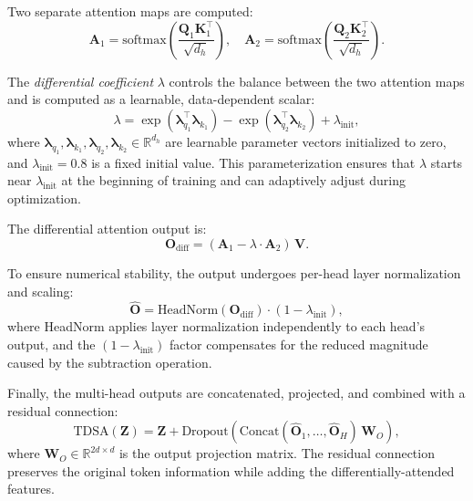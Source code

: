 Two separate attention maps are computed:
\begin{equation}\label{eq:dual_attn}
    \mathbf{A}_1 = \text{softmax}\!\left(\frac{\mathbf{Q}_1 \mathbf{K}_1^\top}{\sqrt{d_h}}\right), \quad
    \mathbf{A}_2 = \text{softmax}\!\left(\frac{\mathbf{Q}_2 \mathbf{K}_2^\top}{\sqrt{d_h}}\right).
\end{equation}

The \emph{differential coefficient} $\lambda$ controls the balance between the two attention maps and is computed as a learnable, data-dependent scalar:
\begin{equation}\label{eq:lambda}
    \lambda = \exp(\boldsymbol{\lambda}_{q_1}^\top \boldsymbol{\lambda}_{k_1}) - \exp(\boldsymbol{\lambda}_{q_2}^\top \boldsymbol{\lambda}_{k_2}) + \lambda_{\text{init}},
\end{equation}
where $\boldsymbol{\lambda}_{q_1}, \boldsymbol{\lambda}_{k_1}, \boldsymbol{\lambda}_{q_2}, \boldsymbol{\lambda}_{k_2} \in \mathbb{R}^{d_h}$ are learnable parameter vectors initialized to zero, and $\lambda_{\text{init}} = 0.8$ is a fixed initial value. This parameterization ensures that $\lambda$ starts near $\lambda_{\text{init}}$ at the beginning of training and can adaptively adjust during optimization.

The differential attention output is:
\begin{equation}\label{eq:diff_attn}
    \mathbf{O}_{\text{diff}} = (\mathbf{A}_1 - \lambda \cdot \mathbf{A}_2) \, \mathbf{V}.
\end{equation}

To ensure numerical stability, the output undergoes per-head layer normalization and scaling:
\begin{equation}
    \hat{\mathbf{O}} = \text{HeadNorm}(\mathbf{O}_{\text{diff}}) \cdot (1 - \lambda_{\text{init}}),
\end{equation}
where HeadNorm applies layer normalization independently to each head's output, and the $(1 - \lambda_{\text{init}})$ factor compensates for the reduced magnitude caused by the subtraction operation.

Finally, the multi-head outputs are concatenated, projected, and combined with a residual connection:
\begin{equation}\label{eq:tdsa_output}
    \text{TDSA}(\mathbf{Z}) = \mathbf{Z} + \text{Dropout}\!\left(\text{Concat}(\hat{\mathbf{O}}_1, \dots, \hat{\mathbf{O}}_H) \, \mathbf{W}_O\right),
\end{equation}
where $\mathbf{W}_O \in \mathbb{R}^{2d \times d}$ is the output projection matrix. The residual connection preserves the original token information while adding the differentially-attended features.


